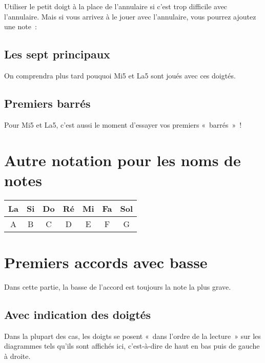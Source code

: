 \documentclass[11pt]{article}
\begin{document}

Utiliser le petit doigt à la place de l’annulaire si c’est trop difficile avec
l’annulaire. Mais si vous arrivez à le jouer avec l’annulaire, vous pourrez
ajoutez une note~:


\subsection{Les sept principaux}


On comprendra plus tard pouquoi Mi5 et La5 sont joués avec ces doigtés.

\subsection{Premiers barrés}

Pour Mi5 et La5, c’est aussi le moment d’essayer vos premiers «~barrés~»~!


\section{Autre notation pour les noms de notes}

\begin{tabular}{ | c | c | c | c | c | c | c | }
    \hline
    La & Si & Do & Ré & Mi & Fa & Sol \\
    \hline
    A & B & C & D & E & F & G \\
    \hline
\end{tabular}

\section{Premiers accords avec basse}

Dans cette partie, la basse de l’accord est toujours la note la plus grave.

\subsection{Avec indication des doigtés}

Dans la plupart des cas, les doigts se posent «~dans l’ordre de la lecture~»
sur les diagrammes tels qu’ils sont affichés ici, c’est-à-dire de haut en bas
puis de gauche à droite. 
\end{document}
